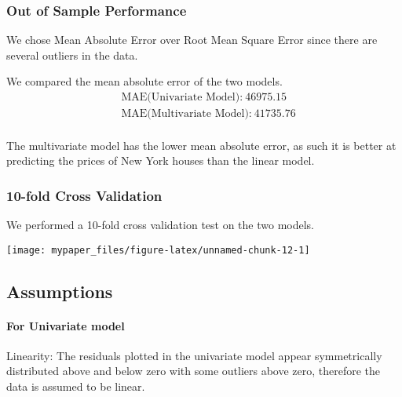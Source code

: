 \documentclass[letterpaper,9pt,twocolumn,twoside,]{pinp}
\begin{document}
\hypertarget{out-of-sample-performance}{%
\subsubsection{Out of Sample
Performance}\label{out-of-sample-performance}}

We chose Mean Absolute Error over Root Mean Square Error since there are
several outliers in the data.

We compared the mean absolute error of the two models.\\
\begin{equation}
  \begin{aligned}
&\text{MAE(Univariate Model):}\ 46975.15\\  
&\text{MAE(Multivariate Model):}\ 41735.76  
       \label{eqn:example}
  \end{aligned}
\end{equation}\\
The multivariate model has the lower mean absolute error, as such it is
better at predicting the prices of New York houses than the linear
model.

\hypertarget{fold-cross-validation}{%
\subsubsection{10-fold Cross Validation}\label{fold-cross-validation}}

We performed a 10-fold cross validation test on the two models.

\begin{center}\texttt{[image: mypaper\_files/figure-latex/unnamed-chunk-12-1]} \end{center}

\hypertarget{assumptions}{%
\subsection{Assumptions}\label{assumptions}}

\hypertarget{for-univariate-model}{%
\paragraph{For Univariate model}\label{for-univariate-model}}

Linearity: The residuals plotted in the univariate model appear
symmetrically distributed above and below zero with some outliers above
zero, therefore the data is assumed to be linear.
\end{document}
